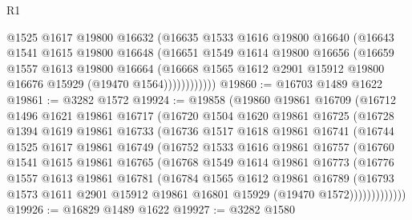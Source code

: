\begin{lexlean}{R1}
\begin{coremodule}
                @1525
                @1617
                @19800
                @16632
                (@16635
                  @1533
                  @1616
                  @19800
                  @16640
                  (@16643
                    @1541
                    @1615
                    @19800
                    @16648
                    (@16651
                      @1549
                      @1614
                      @19800
                      @16656
                      (@16659
                        @1557
                        @1613
                        @19800
                        @16664
                        (@16668
                          @1565
                          @1612
                          @2901
                          @15912
                          @19800
                          @16676
                          @15929
                          (@19470 @1564))))))))))))
@19860 := @16703 @1489 @1622
@19861 := @3282 @1572
@19924 := @19858
    (@19860
      @19861
      @16709
      (@16712
        @1496
        @1621
        @19861
        @16717
        (@16720
          @1504
          @1620
          @19861
          @16725
          (@16728
            @1394
            @1619
            @19861
            @16733
            (@16736
              @1517
              @1618
              @19861
              @16741
              (@16744
                @1525
                @1617
                @19861
                @16749
                (@16752
                  @1533
                  @1616
                  @19861
                  @16757
                  (@16760
                    @1541
                    @1615
                    @19861
                    @16765
                    (@16768
                      @1549
                      @1614
                      @19861
                      @16773
                      (@16776
                        @1557
                        @1613
                        @19861
                        @16781
                        (@16784
                          @1565
                          @1612
                          @19861
                          @16789
                          (@16793
                            @1573
                            @1611
                            @2901
                            @15912
                            @19861
                            @16801
                            @15929
                            (@19470 @1572)))))))))))))
@19926 := @16829 @1489 @1622
@19927 := @3282 @1580

\end{coremodule}
\end{lexlean}

